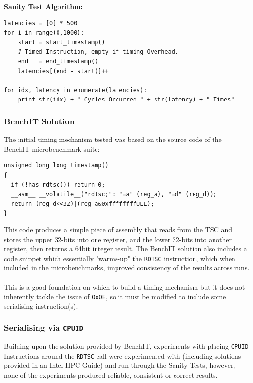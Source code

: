\documentclass[bsc,frontabs,twoside,singlespacing,parskip,deptreport]{infthesis}     %
\begin{document}
\underline{\textbf{Sanity Test Algorithm:}}\label{sanity-test-algo} \\
\begin{verbatim}
latencies = [0] * 500
for i in range(0,1000):
    start = start_timestamp()
    # Timed Instruction, empty if timing Overhead.
    end   = end_timestamp()
    latencies[(end - start)]++

for idx, latency in enumerate(latencies):
    print str(idx) + " Cycles Occurred " + str(latency) + " Times"
\end{verbatim}


\subsubsection{BenchIT Solution\cite{benchit_src}}\label{benchit-disc}
The initial timing mechanism tested was based on the source code of the BenchIT microbenchmark suite:
\begin{verbatim}
unsigned long long timestamp()
{
  if (!has_rdtsc()) return 0;
  __asm__ __volatile__("rdtsc;": "=a" (reg_a), "=d" (reg_d));
  return (reg_d<<32)|(reg_a&0xffffffffULL);
}
\end{verbatim}
This code produces a simple piece of assembly that reads from the TSC and stores the upper 32-bits into one register, and the lower 32-bits into another register, then returns a 64bit integer result. The BenchIT solution also includes a code snippet which essentially "warms-up" the \texttt{RDTSC} instruction, which when included in the microbenchmarks, improved consistency of the results across runs.\\
\\
This is a good foundation on which to build a timing mechanism but it does not inherently tackle the issue of \texttt{OoOE}, so it must be modified to include some serialising instruction(s).

\subsubsection{Serialising via \texttt{CPUID}}
Building upon the solution provided by BenchIT, experiments with placing \texttt{CPUID} Instructions around the \texttt{RDTSC} call were experimented with (including solutions provided in an Intel HPC Guide\cite{intel_hpc_guide}) and run through the Sanity Tests, however, none of the experiments produced reliable, consistent or correct results.
\end{document}
